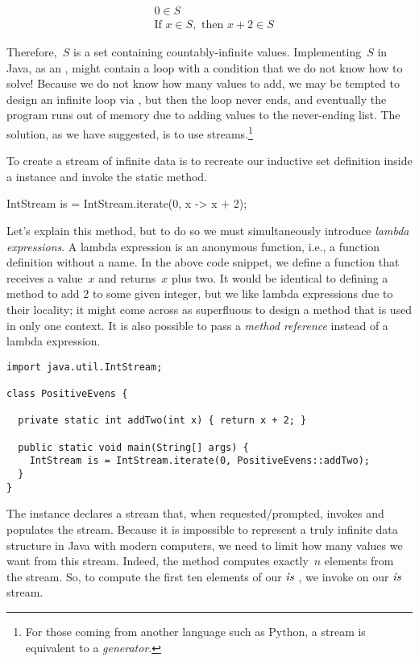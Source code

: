 \begin{align*}
    &0 \in S\\
    &\text{If } x \in S,\text{ then }x + 2 \in S
\end{align*}

Therefore,~$S$ is a set containing countably-infinite values. 
Implementing~$S$ in Java, as an , might contain a  loop with a condition that we do not know how to solve! 
Because we do not know how many values to add, we may be tempted to design an infinite loop via , but then the loop never ends, and eventually the program runs out of memory due to adding values to the never-ending list. 
The solution, as we have suggested, is to use streams.\footnote{For those coming from another language such as Python, a stream is equivalent to a \emph{generator}.}


To create a stream of infinite data is to recreate our inductive set definition inside a  instance and invoke the  static method.

\begin{verbnobox}[\small]
IntStream is = IntStream.iterate(0, x -> x + 2);
\end{verbnobox}

Let's explain this method, but to do so we must simultaneously introduce \emph{lambda expressions}. 
A lambda expression is an anonymous function, i.e., a function definition without a name. 
In the above code snippet, we define a function that receives a value~$x$ and returns~$x$ plus two. 
It would be identical to defining a  method to add $2$ to some given integer, but we like lambda expressions due to their locality; it might come across as superfluous to design a method that is used in only one context. 
It is also possible to pass a \emph{method reference} instead of a lambda expression.

\begin{lstlisting}[language=MyJava]
import java.util.IntStream;

class PositiveEvens {

  private static int addTwo(int x) { return x + 2; }

  public static void main(String[] args) {
    IntStream is = IntStream.iterate(0, PositiveEvens::addTwo);
  }
}   
\end{lstlisting}

The  instance declares a stream that, when requested/prompted, invokes and populates the stream. 
Because it is impossible to represent a truly infinite data structure in Java with modern computers, we need to limit how many values we want from this stream. 
Indeed, the  method computes exactly~$n$ elements from the stream. 
So, to compute the first ten elements of our $\emph{is}$ , we invoke  on our $\emph{is}$ stream. 

